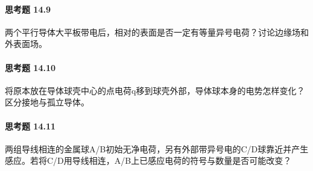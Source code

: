 \paragraph{思考题 14.9}
两个平行导体大平板带电后，相对的表面是否一定有等量异号电荷？讨论边缘场和外表面场。

\paragraph{思考题 14.10}
将原本放在导体球壳中心的点电荷q移到球壳外部，导体球本身的电势怎样变化？区分接地与孤立导体。

\paragraph{思考题 14.11}
两组导线相连的金属球A/B初始无净电荷，另有外部带异号电的C/D球靠近并产生感应。若将C/D用导线相连，A/B上已感应电荷的符号与数量是否可能改变？
